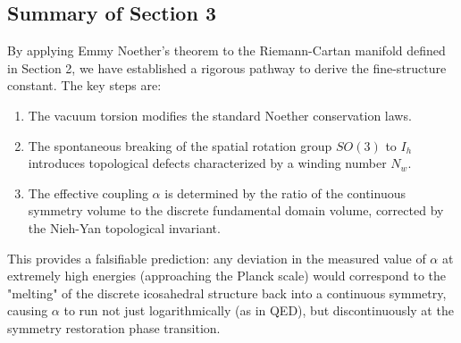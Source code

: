 \subsection{Summary of Section 3}

By applying Emmy Noether's theorem to the Riemann-Cartan manifold defined in Section 2, we have established a rigorous pathway to derive the fine-structure constant. The key steps are:
\begin{enumerate}
    \item The vacuum torsion modifies the standard Noether conservation laws.
    \item The spontaneous breaking of the spatial rotation group $SO(3)$ to $I_h$ introduces topological defects characterized by a winding number $N_w$.
    \item The effective coupling $\alpha$ is determined by the ratio of the continuous symmetry volume to the discrete fundamental domain volume, corrected by the Nieh-Yan topological invariant.
\end{enumerate}

This provides a falsifiable prediction: any deviation in the measured value of $\alpha$ at extremely high energies (approaching the Planck scale) would correspond to the "melting" of the discrete icosahedral structure back into a continuous symmetry, causing $\alpha$ to run not just logarithmically (as in QED), but discontinuously at the symmetry restoration phase transition.